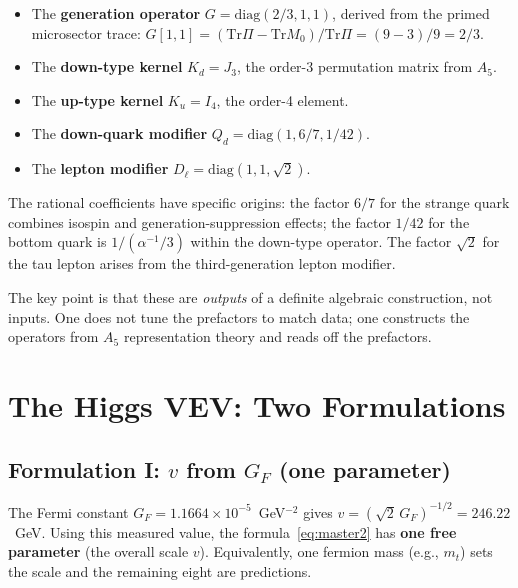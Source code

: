 \documentclass[11pt,a4paper]{article}
\newcommand{\Tr}{\mathrm{Tr}}
\theoremstyle{definition}
\theoremstyle{remark}
\begin{document}
\begin{itemize}
\item The \textbf{generation operator} $G = \mathrm{diag}(2/3, 1, 1)$,
  derived from the primed microsector trace:
  $G[1,1] = (\Tr\Pi - \Tr M_0)/\Tr\Pi = (9-3)/9 = 2/3$.

\item The \textbf{down-type kernel} $K_d = J_3$, the order-3
  permutation matrix from $A_5$.

\item The \textbf{up-type kernel} $K_u = I_4$, the order-4 element.

\item The \textbf{down-quark modifier} $Q_d = \mathrm{diag}(1, 6/7, 1/42)$.

\item The \textbf{lepton modifier} $D_\ell = \mathrm{diag}(1, 1, \sqrt{2})$.
\end{itemize}

The rational coefficients have specific origins:
the factor $6/7$ for the strange quark combines isospin and
generation-suppression effects;
the factor $1/42$ for the bottom quark is $1/(\alpha^{-1}/3)$
within the down-type operator.
The factor $\sqrt{2}$ for the tau lepton arises from the
third-generation lepton modifier.

The key point is that these are \emph{outputs} of a definite
algebraic construction, not inputs.
One does not tune the prefactors to match data; one constructs the
operators from $A_5$ representation theory and reads off the prefactors.

\section{The Higgs VEV: Two Formulations}
\label{sec:vev}

\subsection{Formulation I: $v$ from $G_F$ (one parameter)}

The Fermi constant $G_F = 1.1664 \times 10^{-5}$~GeV$^{-2}$ gives
$v = (\sqrt{2}\,G_F)^{-1/2} = 246.22$~GeV.
Using this measured value, the formula~\eqref{eq:master2} has
\textbf{one free parameter} (the overall scale $v$).
Equivalently, one fermion mass (e.g., $m_t$) sets the scale and the
remaining eight are predictions.
\end{document}
